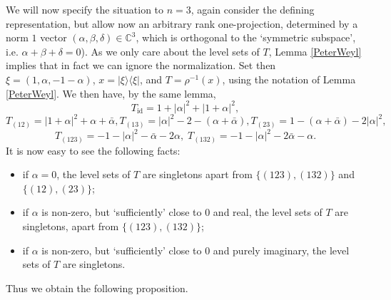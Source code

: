 \documentclass[12pt]{amsart}
\theoremstyle{definition}
\theoremstyle{definition}
\theoremstyle{definition}
\theoremstyle{definition}
\newcommand{\C}{\mathbb{C}}
\numberwithin{equation}{section}
\begin{document}
We will now specify the situation to $n=3$, again consider the defining representation, but allow now an arbitrary rank one-projection, determined by a norm $1$ vector $(\alpha, \beta, \delta) \in \C^3$, which is orthogonal to the `symmetric subspace', i.e. $\alpha +\beta +\delta =0$). As we only care about the level sets of $T$, Lemma \ref{PeterWeyl} implies that in fact we can ignore the normalization. Set then $\xi = (1, \alpha, -1-\alpha)$, $x= |\xi \rangle \langle \xi |$, and $T=\rho^{-1}(x)$, using the notation of Lemma \ref{PeterWeyl}.
We then have, by the same lemma,
\[T_{\mathrm{id}} = 1+|\alpha|^2 +|1+\alpha|^2,\]
\[ T_{(12)} = |1+\alpha|^2 +\alpha + \bar{\alpha} , 
T_{(13)} = |\alpha|^2 - 2 -(\alpha + \bar{\alpha}),
T_{(23)} = 1- (\alpha + \bar{\alpha}) - 2 |\alpha|^2  ,  \]
\[ T_{(123)} = - 1 - |\alpha|^2  - \bar{\alpha} - 2 \alpha, \; T_{(132)} = - 1 - |\alpha|^2  - 2\bar{\alpha} -  \alpha.\]
It is now easy to see the following facts:
\begin{itemize}
\item[(1)] if $\alpha=0$,  the level sets of $T$ are singletons apart from $\{(123), (132)\}$ and $\{(12),(23)\}$;
\item[(2)] if $\alpha$ is non-zero, but `sufficiently' close to 0 and real, the level sets of $T$ are singletons, apart from $\{(123), (132)\}$;
\item[(3)] if $\alpha$ is non-zero, but `sufficiently' close to 0 and purely imaginary, the level sets of $T$ are singletons.
\end{itemize} 


Thus we obtain the following proposition.
\end{document}
